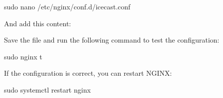 \documentclass[letterpaper,10pt,english]{sphinxmanual}
\begin{document}
\begin{sphinxVerbatim}[commandchars=\\\{\}]
sudo nano /etc/nginx/conf.d/icecast.conf
\end{sphinxVerbatim}

\sphinxAtStartPar
And add this content:

\begin{sphinxVerbatim}[commandchars=\\\{\}]

\end{sphinxVerbatim}

\sphinxAtStartPar
Save the file and run the following command to test the configuration:

\begin{sphinxVerbatim}[commandchars=\\\{\}]
sudo nginx \PYGZhy{}t
\end{sphinxVerbatim}

\sphinxAtStartPar
If the configuration is correct, you can restart NGINX:

\begin{sphinxVerbatim}[commandchars=\\\{\}]
sudo systemctl restart nginx
\end{sphinxVerbatim}
\end{document}
